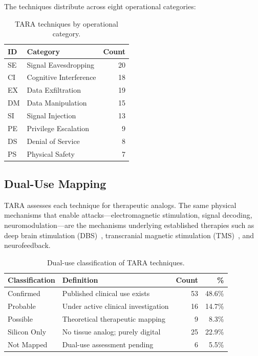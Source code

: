 The \SnapshotTechniques{} techniques distribute across eight operational categories:

\begin{table}[H]
\centering
\caption{TARA techniques by operational category.}
\label{tab:categories}
\small
\begin{tabular}{@{}l l r@{}}
\toprule
\textbf{ID} & \textbf{Category} & \textbf{Count} \\
\midrule
SE & Signal Eavesdropping    & 20 \\
CI & Cognitive Interference  & 18 \\
EX & Data Exfiltration       & 19 \\
DM & Data Manipulation       & 15 \\
SI & Signal Injection        & 13 \\
PE & Privilege Escalation    &  9 \\
DS & Denial of Service       &  8 \\
PS & Physical Safety         &  7 \\
\bottomrule
\end{tabular}
\end{table}

\subsection{Dual-Use Mapping}

TARA assesses each technique for therapeutic analogs. The same physical mechanisms that
enable attacks---electromagnetic stimulation, signal decoding, neuromodulation---are
the mechanisms underlying established therapies such as deep brain stimulation
(DBS)~\cite{lozano2019dbs}, transcranial magnetic stimulation
(TMS)~\cite{hallett2007tms}, and neurofeedback.

\begin{table}[H]
\centering
\caption{Dual-use classification of \SnapshotTechniques{} TARA techniques.}
\label{tab:dualuse}
\small
\begin{tabular}{@{}l l r r@{}}
\toprule
\textbf{Classification} & \textbf{Definition} & \textbf{Count} & \textbf{\%} \\
\midrule
Confirmed    & Published clinical use exists      & 53 & 48.6\% \\
Probable     & Under active clinical investigation & 16 & 14.7\% \\
Possible     & Theoretical therapeutic mapping     &  9 &  8.3\% \\
Silicon Only & No tissue analog; purely digital    & 25 & 22.9\% \\
Not Mapped   & Dual-use assessment pending         &  6 &  5.5\% \\
\bottomrule
\end{tabular}
\end{table}

